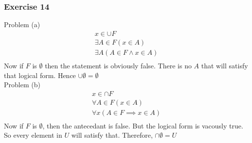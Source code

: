 \subsubsection{Exercise 14}
Problem (a)
\begin{align*}
  x \in \cup F \\
  \exists A \in F(x \in A)  \\
  \exists A (A \in F \land x \in A) \\
\end{align*}
Now if $F$ is $\emptyset$ then the statement is obviously false. There
is no $A$ that will satisfy that logical form. Hence $\cup \emptyset =
\emptyset$ \\

Problem (b)
\begin{align*}
  x \in \cap F \\
  \forall A \in F(x \in A) \\
  \forall x (A \in F \implies x \in A) \\
\end{align*}
Now if $F$ is $\emptyset$, then the antecedant is false. But the
logical form is vacously true. So every element in $U$ will satisfy
that. Therefore, $\cap \emptyset = U$